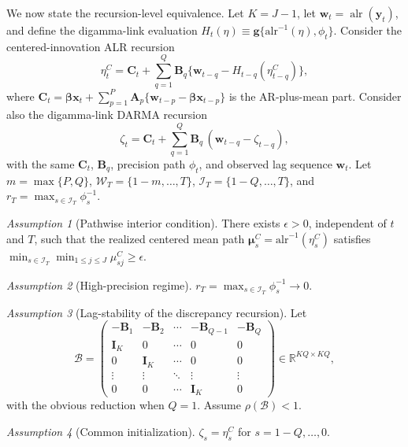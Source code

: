 \documentclass[12pt]{article}
\newcommand{\alrinv}{\mathrm{alr}^{-1}}
\theoremstyle{remark}
\newtheorem{assumption}{Assumption}
\newcommand{\R}{\mathbb{R}}
\newcommand{\alr}{\operatorname{alr}}
\newcommand{\bfmu}{\boldsymbol{\mu}}
\newcommand{\bfbeta}{\boldsymbol{\beta}}
\newcommand{\bfA}{\mathbf{A}}
\newcommand{\bfB}{\mathbf{B}}
\newcommand{\bfC}{\mathbf{C}}
\newcommand{\bfI}{\mathbf{I}}
\newcommand{\bfx}{\mathbf{x}}
\newcommand{\bfy}{\mathbf{y}}
\newcommand{\bfw}{\mathbf{w}}
\begin{document}
We now state the recursion-level equivalence. Let $K=J-1$, let $\bfw_t=\alr(\bfy_t)$, and define the digamma-link evaluation $H_t(\eta)\equiv \mathbf{g}\{\alrinv(\eta),\phi_t\}$. Consider the centered-innovation ALR recursion
\begin{equation}\label{eq:centered-recursion}
\eta_t^{C}
= \bfC_t+
\sum_{q=1}^Q \bfB_q
\{\bfw_{t-q}-H_{t-q}(\eta_{t-q}^{C})\},\tag{C}
\end{equation}
where $\bfC_t=\bfbeta\bfx_t+\sum_{p=1}^P \bfA_p\{\bfw_{t-p}-\bfbeta\bfx_{t-p}\}$ is the AR-plus-mean part. Consider also the digamma-link DARMA recursion
\begin{equation}\label{eq:digamma-recursion}
\zeta_t = \bfC_t + \sum_{q=1}^Q \bfB_q\,(\bfw_{t-q}-\zeta_{t-q}),\tag{D}
\end{equation}
with the same $\bfC_t$, $\bfB_q$, precision path $\phi_t$, and observed lag sequence $\bfw_t$. Let $m=\max\{P,Q\}$, $\mathcal{W}_T=\{1-m,\ldots,T\}$, $\mathcal{I}_T=\{1-Q,\ldots,T\}$, and $r_T=\max_{s\in\mathcal{I}_T}\phi_s^{-1}$.

\begin{assumption}[Pathwise interior condition]\label{ass:interior}
There exists $\epsilon>0$, independent of $t$ and $T$, such that the realized centered mean path $\bfmu_s^{C}=\alrinv(\eta_s^{C})$ satisfies $\min_{s\in\mathcal{I}_T}\min_{1\le j\le J}\mu_{sj}^{C}\ge\epsilon$.
\end{assumption}

\begin{assumption}[High-precision regime]\label{ass:phi}
$r_T=\max_{s\in\mathcal{I}_T}\phi_s^{-1}\to 0$.
\end{assumption}

\begin{assumption}[Lag-stability of the discrepancy recursion]\label{ass:stab}
Let
\[
\mathcal{B}=\begin{pmatrix}
-\bfB_1 & -\bfB_2 & \cdots & -\bfB_{Q-1} & -\bfB_Q\\
\bfI_K  & 0    & \cdots & 0        & 0\\
0    & \bfI_K  & \cdots & 0        & 0\\
\vdots & \vdots & \ddots & \vdots & \vdots\\
0    & 0    & \cdots & \bfI_K      & 0
\end{pmatrix}\in\R^{KQ\times KQ},
\]
with the obvious reduction when $Q=1$. Assume $\rho(\mathcal{B})<1$.
\end{assumption}

\begin{assumption}[Common initialization]\label{ass:init}
$\zeta_s=\eta_s^{C}$ for $s=1-Q,\ldots,0$.
\end{assumption}
\end{document}
